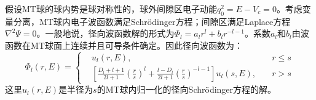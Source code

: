 假设MT球的球内势是球对称性的，球外间隙区电子动能$q_0^2=E-V_c=0$。考虑变量分离，MT球内电子波函数满足Schr\"odinger方程；间隙区满足Laplace方程$\nabla^2\Psi=0$。一般地说，径向波函数解的形式为$\Phi_l=a_lr^l+b_lr^{-l-1}$。系数$a_l$和$b_l$由波函数在MT球面上连续并且可导条件确定。因此径向波函数为：
\begin{displaymath}
  \Phi_l(r,E)=\left\{
  \begin{aligned}
    &u_l(r,E),&r\leqslant s\\
    &\left[\frac{D_l+l+1}{2l+1}\left(\frac rs\right)^l+\frac{l-D_l}{2l+1}\left(\frac rs\right)^{-l-1}\right]u_l(s,E),\quad&r>s
  \end{aligned}\right.
\end{displaymath}
这里$u_l(r,E)$是半径为$s$的MT球内归一化的径向Schr\"odinger方程的解。

